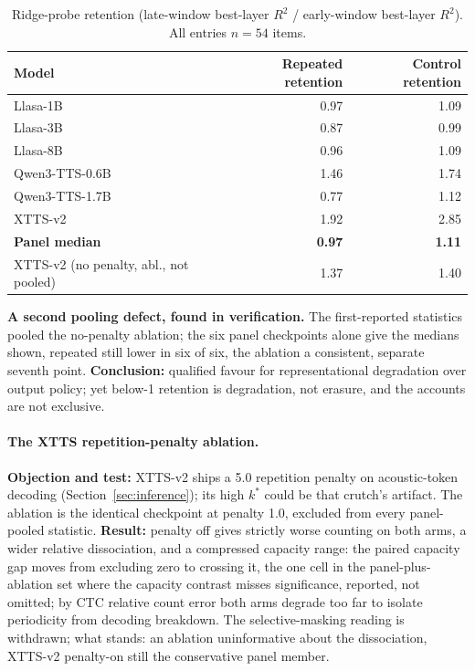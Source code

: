 \begin{table}[htbp]
\centering
\caption{Ridge-probe retention (late-window best-layer $R^2$ / early-window best-layer $R^2$). All
entries $n{=}54$ items.}
\label{tab:probe}
\small
\begin{tabular}{@{}lrr@{}}
\toprule
Model & Repeated retention & Control retention \\
\midrule
Llasa-1B & 0.97 & 1.09 \\
Llasa-3B & 0.87 & 0.99 \\
Llasa-8B & 0.96 & 1.09 \\
Qwen3-TTS-0.6B & 1.46 & 1.74 \\
Qwen3-TTS-1.7B & 0.77 & 1.12 \\
XTTS-v2 & 1.92 & 2.85 \\
\midrule
\textbf{Panel median} & \textbf{0.97} & \textbf{1.11} \\
XTTS-v2 (no penalty, abl., not pooled) & 1.37 & 1.40 \\
\bottomrule
\end{tabular}
\end{table}

\noindent\textbf{A second pooling defect, found in verification.} The first-reported statistics
pooled the no-penalty ablation; the six panel checkpoints alone give the medians shown, repeated
still lower in six of six, the ablation a consistent, separate seventh point.
\textbf{Conclusion:} qualified favour for representational degradation over output policy; yet
below-1 retention is degradation, not erasure, and the accounts are not exclusive.

\paragraph{The XTTS repetition-penalty ablation.} \textbf{Objection and test:} XTTS-v2 ships a
5.0 repetition penalty on acoustic-token decoding (Section~\ref{sec:inference}); its high
$k^\ast$ could be that crutch's artifact. The ablation is the identical checkpoint at penalty
1.0, excluded from every panel-pooled statistic. \textbf{Result:} penalty off gives strictly
worse counting on both arms, a wider relative dissociation, and a compressed capacity range:
the paired capacity gap moves from excluding zero to crossing it, the one cell in the
panel-plus-ablation set where the capacity contrast misses significance, reported, not omitted;
by CTC relative count error both arms degrade too far to isolate periodicity from decoding
breakdown. The selective-masking reading is withdrawn; what stands: an ablation uninformative
about the dissociation, XTTS-v2 penalty-on still the conservative panel member.

